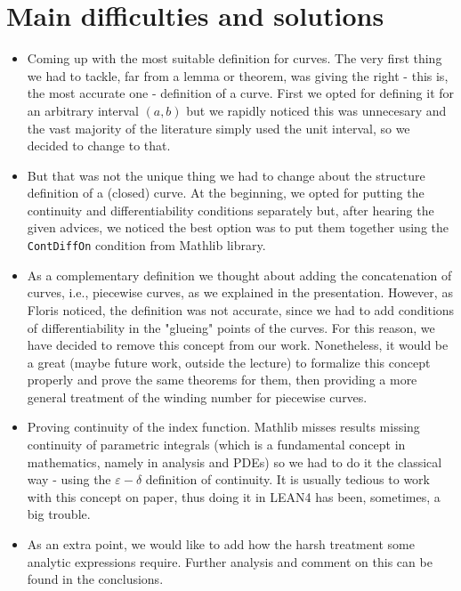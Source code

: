 \documentclass[a4paper,12pt]{article}
\begin{document}
\section{Main difficulties and solutions}
\begin{itemize}
  \item Coming up with the most suitable definition for curves. The very first thing we had to tackle, far from a lemma or theorem, was giving the right - this is, the
  most accurate one - definition of a curve. First we opted for defining it for an arbitrary interval $(a, b)$
  but we rapidly noticed this was unnecesary and the vast majority of the literature simply used the unit interval,
  so we decided to change to that.
  \item But that was not the unique thing we had to change about the structure definition of a (closed) curve. At the beginning, we opted
  for putting the continuity and differentiability conditions separately but, after hearing the given advices, we noticed
  the best option was to put them together using the \verb|ContDiffOn| condition from Mathlib library.
  \item As a complementary definition we thought about adding the concatenation of curves, i.e.,
  piecewise curves, as we explained in the presentation. However, as Floris noticed, the definition was not
  accurate, since we had to add conditions of differentiability in the "glueing" points of the curves. For this
  reason, we have decided to remove this concept from our work. Nonetheless, it would be a great (maybe future work,
  outside the lecture) to formalize this concept properly and prove the same theorems for them, then providing a
  more general treatment of the winding number for piecewise curves.
  \item Proving continuity of the index function. Mathlib misses results missing continuity of parametric
  integrals (which is a fundamental concept in mathematics, namely in analysis and PDEs) so we had to do it the classical
  way - using the $\varepsilon - \delta$ definition of continuity. It is usually tedious to work with this concept
  on paper, thus doing it in LEAN4 has been, sometimes, a big trouble.
  \item As an extra point, we would like to add how the harsh treatment some analytic expressions require. Further analysis and
  comment on this can be found in the conclusions.
\end{itemize}
\end{document}
